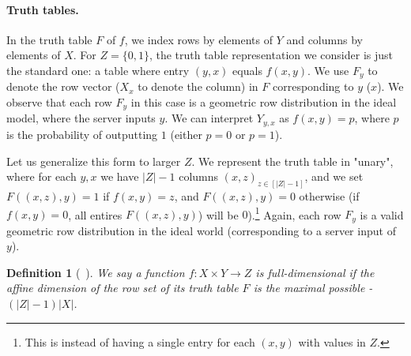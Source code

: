 \documentclass[a4paper]{article}
\newtheorem{definition}{Definition}[section]
\begin{document}
\paragraph{Truth tables.} In the truth table $F$ of $f$, we index rows by elements of $Y$ and columns by elements of $X$. For $Z=\{0,1\}$, the truth table representation we consider is just the standard one: a table where entry $(y,x)$ equals $f(x,y)$. We use $F_y$ to denote the row vector ($X_x$ to denote the column) in $F$ corresponding to $y$ ($x$).
We observe that each row $F_y$ in this case is a geometric row distribution in the ideal model, where the server inputs $y$. We can interpret $Y_{y,x}$ as $f(x,y) = p$, where $p$ is the probability of outputting $1$ (either $p=0$ or $p=1$). 


Let us generalize this form to larger $Z$. We represent the truth table in "unary", where for each $y,x$ we have $|Z|-1$ columns $(x,z)_{z\in [|Z|-1]}$, and we set $F((x,z),y)=1$
if $f(x,y)=z$, and $F((x,z),y)=0$ otherwise (if $f(x,y)=0$, all entires $F((x,z),y)$) will be $0$).\footnote{This is instead of having a single entry for each $(x,y)$ with values in $Z$.}
Again, each row $F_y$ is a valid geometric row distribution in the ideal world (corresponding to a server input of $y$).

\begin{definition}[~\cite{Ash14}]
	We say a function $f:X\times Y\rightarrow Z$ is full-dimensional if the affine dimension of the row set of its truth table $F$ is the maximal possible - $(|Z|-1)|X|$.
\end{definition}
\end{document}
